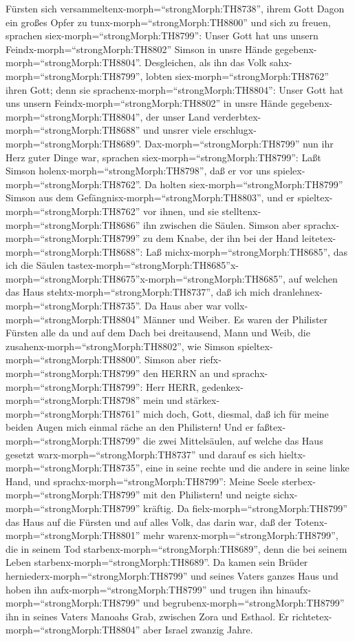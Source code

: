 Fürsten sich versammeltenx-morph=``strongMorph:TH8738'', ihrem Gott
Dagon ein großes Opfer zu tunx-morph=``strongMorph:TH8800'' und sich zu
freuen, sprachen siex-morph=``strongMorph:TH8799'': Unser Gott hat uns
unsern Feindx-morph=``strongMorph:TH8802'' Simson in unsre Hände
gegebenx-morph=``strongMorph:TH8804''.  Desgleichen, als
ihn das Volk sahx-morph=``strongMorph:TH8799'', lobten
siex-morph=``strongMorph:TH8762'' ihren Gott; denn sie
sprachenx-morph=``strongMorph:TH8804'': Unser Gott hat uns unsern
Feindx-morph=``strongMorph:TH8802'' in unsre Hände
gegebenx-morph=``strongMorph:TH8804'', der unser Land
verderbtex-morph=``strongMorph:TH8688'' und unsrer viele
erschlugx-morph=``strongMorph:TH8689''. 
Dax-morph=``strongMorph:TH8799'' nun ihr Herz guter Dinge war, sprachen
siex-morph=``strongMorph:TH8799'': Laßt Simson
holenx-morph=``strongMorph:TH8798'', daß er vor uns
spielex-morph=``strongMorph:TH8762''. Da holten
siex-morph=``strongMorph:TH8799'' Simson aus dem
Gefängnisx-morph=``strongMorph:TH8803'', und er
spieltex-morph=``strongMorph:TH8762'' vor ihnen, und sie
stelltenx-morph=``strongMorph:TH8686'' ihn zwischen die Säulen.
 Simson aber sprachx-morph=``strongMorph:TH8799'' zu dem
Knabe, der ihn bei der Hand leitetex-morph=``strongMorph:TH8688'': Laß
michx-morph=``strongMorph:TH8685'', das ich die Säulen
tastex-morph=``strongMorph:TH8685''\textbar x-morph=``strongMorph:TH8675''x-morph=``strongMorph:TH8685'',
auf welchen das Haus stehtx-morph=``strongMorph:TH8737'', daß ich mich
dranlehnex-morph=``strongMorph:TH8735''.  Da Haus aber war
vollx-morph=``strongMorph:TH8804'' Männer und Weiber. Es waren der
Philister Fürsten alle da und auf dem Dach bei dreitausend, Mann und
Weib, die zusahenx-morph=``strongMorph:TH8802'', wie Simson
spieltex-morph=``strongMorph:TH8800''.  Simson aber
riefx-morph=``strongMorph:TH8799'' den HERRN an und
sprachx-morph=``strongMorph:TH8799'': Herr HERR,
gedenkex-morph=``strongMorph:TH8798'' mein und
stärkex-morph=``strongMorph:TH8761'' mich doch, Gott, diesmal, daß ich
für meine beiden Augen mich einmal räche an den Philistern!
 Und er faßtex-morph=``strongMorph:TH8799'' die zwei
Mittelsäulen, auf welche das Haus gesetzt
warx-morph=``strongMorph:TH8737'' und darauf es sich
hieltx-morph=``strongMorph:TH8735'', eine in seine rechte und die andere
in seine linke Hand,  und
sprachx-morph=``strongMorph:TH8799'': Meine Seele
sterbex-morph=``strongMorph:TH8799'' mit den Philistern! und neigte
sichx-morph=``strongMorph:TH8799'' kräftig. Da
fielx-morph=``strongMorph:TH8799'' das Haus auf die Fürsten und auf
alles Volk, das darin war, daß der Totenx-morph=``strongMorph:TH8801''
mehr warenx-morph=``strongMorph:TH8799'', die in seinem Tod
starbenx-morph=``strongMorph:TH8689'', denn die bei seinem Leben
starbenx-morph=``strongMorph:TH8689''.  Da kamen sein
Brüder herniederx-morph=``strongMorph:TH8799'' und seines Vaters ganzes
Haus und hoben ihn aufx-morph=``strongMorph:TH8799'' und trugen ihn
hinaufx-morph=``strongMorph:TH8799'' und
begrubenx-morph=``strongMorph:TH8799'' ihn in seines Vaters Manoahs
Grab, zwischen Zora und Esthaol. Er
richtetex-morph=``strongMorph:TH8804'' aber Israel zwanzig Jahre.


